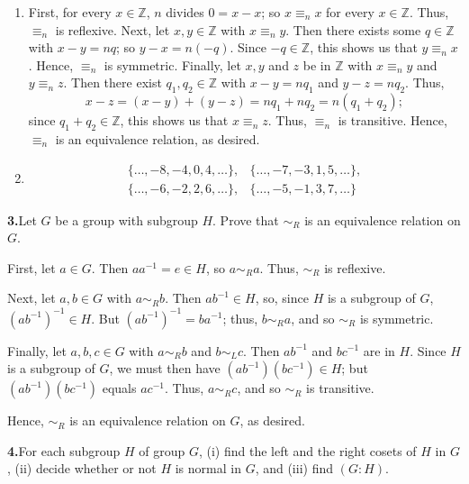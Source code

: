 \documentclass[10pt,]{book}
\theoremstyle{plain}
\theoremstyle{definition}
\theoremstyle{definition}
\theoremstyle{definition}
\theoremstyle{definition}
\numberwithin{equation}{section}
\def\Z{\mathbb{Z}}
\def\siml{\sim_L}
\def\simr{\sim_R}
\newcommand{\amp}{&}
\begin{document}
\begin{enumerate}[label=(\alph*)]
\item\hypertarget{li-410}{}First, for every \(x \in \Z\), \(n\) divides \(0=x-x\); so \(x\equiv_n x\) for every \(x\in
\Z\).  Thus, \(\equiv_n\) is reflexive. Next, let \(x,y \in \Z\) with \(x\equiv_n y\).  Then there exists some \(q\in \Z\) with \(x-y=nq\); so \(y-x=n(-q)\). Since \(-q\in \Z\), this shows us that \(y\equiv_n x\).  Hence, \(\equiv_n\) is symmetric. Finally, let \(x,y\) and \(z\) be in \(\Z\) with \(x\equiv_n
y\) and \(y\equiv_nz\).  Then there exist \(q_1,q_2 \in \Z\) with \(x-y=nq_1\) and \(y-z=nq_2\).  Thus,%
\begin{equation*}
x-z=(x-y)+(y-z)=nq_1+nq_2=n(q_1+q_2);
\end{equation*}
since \(q_1+q_2 \in \Z\), this shows us that \(x\equiv_n z\).  Thus, \(\equiv_n\) is transitive. Hence, \(\equiv_n\) is an equivalence relation, as desired.%
\item\hypertarget{li-411}{}%
\begin{align*}
\{\ldots,-8,-4,0,4,\ldots\},\amp 
\{\ldots,-7,-3,1,5,\ldots\},\\
\{\ldots,-6,-2,2,6,\ldots\},\amp 
\{\ldots,-5,-1,3,7,\ldots\}
\end{align*}
%
\end{enumerate}
\par\smallskip
\noindent\textbf{3.}\quad{}Let \(G\) be a group with subgroup \(H\). Prove that \(\simr\) is an equivalence relation on \(G\).%
\par\smallskip
First, let \(a\in G\). Then \(aa^{-1}=e\in H\), so \(a\simr a\). Thus, \(\simr\) is reflexive.%
\par
Next, let \(a,b\in G\) with \(a\simr b\). Then \(ab^{-1}\in H\), so, since \(H\) is a subgroup of \(G\), \((ab^{-1})^{-1}\in H\). But \((ab^{-1})^{-1}=ba^{-1}\); thus, \(b\simr a\), and so \(\simr\) is symmetric.%
\par
Finally, let \(a,b,c\in G\) with \(a\simr b\) and \(b\siml c\). Then \(ab^{-1}\) and \(bc^{-1}\) are in \(H\). Since \(H\) is a subgroup of \(G\), we must then have \((ab^{-1})(bc^{-1})\in H\); but \((ab^{-1})(bc^{-1})\) equals \(ac^{-1}\). Thus, \(a\simr c\), and so \(\simr\) is transitive.%
\par
Hence, \(\simr\) is an equivalence relation on \(G\), as desired.%
\par\smallskip
\noindent\textbf{4.}\quad{}For each subgroup \(H\) of group \(G\), (i) find the left and the right cosets of \(H\) in \(G\), (ii) decide whether or not \(H\) is normal in \(G\), and (iii) find \((G:H)\).%
\end{document}

